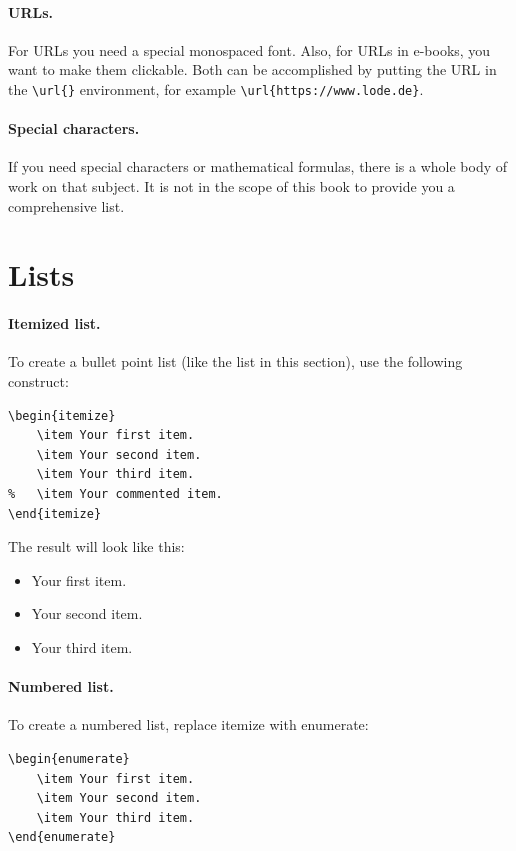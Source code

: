 \paragraph{URLs.} For URLs you need a special monospaced font. Also, for URLs in
e-books, you want to make them clickable. Both can be accomplished by putting
the URL in the \lstinline[language=Tex]!\url{}! environment, for example
\lstinline[language=Tex]!\url{https://www.lode.de}!.

\paragraph{Special characters.} If you need special characters or mathematical
formulas, there is a whole body of work on that subject. It is not in the scope
of this book to provide you a comprehensive list.

\section{Lists}\label{sec:c1_lists}

\paragraph{Itemized list.} To create a bullet point list (like the list in this
section), use the following construct:%
\begin{lstlisting}[language=Tex]
\begin{itemize}
    \item Your first item.
    \item Your second item.
    \item Your third item.
%   \item Your commented item.
\end{itemize}
\end{lstlisting}

The result will look like this:%
\begin{itemize}
    \item Your first item.
    \item Your second item.
    \item Your third item.
\end{itemize}

\paragraph{Numbered list.} To create a numbered list, replace itemize with
enumerate:%
\begin{lstlisting}[language=Tex]
\begin{enumerate}
    \item Your first item.
    \item Your second item.
    \item Your third item.
\end{enumerate}
\end{lstlisting}

